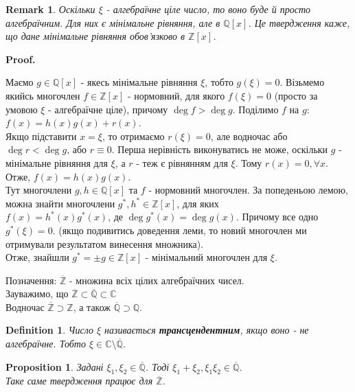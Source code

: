 \documentclass[a4paper, 14pt]{extarticle}
\makeatletter
\theoremstyle{theoremdd}
\theoremstyle{theoremdd}
\newtheorem{definition}[theorem]{Definition}
\theoremstyle{theoremdd}
\theoremstyle{theoremdd}
\theoremstyle{theoremdd}
\newtheorem{proposition}[theorem]{Proposition}
\theoremstyle{theoremdd}
\newtheorem{remark}[theorem]{Remark}
\theoremstyle{theoremdd}
\theoremstyle{theoremdd}
\def\qed{$\blacksquare$}
\renewenvironment{proof}[1][Proof.\\]{\par
\pushQED{\hfill \qed}%
\normalfont \topsep6\p@\@plus6\p@\relax
\trivlist
\item\relax
{\bfseries
#1\@addpunct{.}}\hspace\labelsep\ignorespaces
}{%
\popQED\endtrivlist\@endpefalse
}
\makeatother
\begin{document}
\begin{remark}
Оскільки $\xi$ - алгебраїчне ціле число, то воно буде й просто алгебраїчним. Для них є мінімальне рівняння, але в $\mathbb{Q}[x]$. Це твердження каже, що дане мінімальне рівняння обов'язково в $\mathbb{Z}[x]$.
\end{remark}

\begin{proof}
Маємо $g \in \mathbb{Q}[x]$ - якесь мінімальне рівняння $\xi$, тобто $g(\xi) = 0$. Візьмемо якийсь многочлен $f \in \mathbb{Z}[x]$ - нормовний, для якого $f(\xi) = 0$ (просто за умовою $\xi$ - алгебраїчне ціле), причому $\deg f > \deg g$. Поділимо $f$ на $g$:\\
$f(x) = h(x)g(x) + r(x)$.\\
Якщо підставити $x = \xi$, то отримаємо $r(\xi) = 0$, але водночас або $\deg r < \deg g$, або $r \equiv 0$. Перша нерівність виконуватись не може, оскільки $g$ - мінімальне рівняння для $\xi$, а $r$ - теж є рівнянням для $\xi$. Тому $r(x) = 0, \forall x$.\\
Отже, $f(x) = h(x)g(x)$.\\
Тут многочлени $g,h \in \mathbb{Q}[x]$ та $f$ - нормовний многочлен. За попеденьою лемою, можна знайти многочлени $g^*,h^* \in \mathbb{Z}[x]$, для яких\\
$f(x) = h^*(x)g^*(x)$, де $\deg g^*(x) = \deg g(x)$. Причому все одно $g^*(\xi) = 0$. (якщо подивитись доведення леми, то новий многочлен ми отримували результатом винесення множника).\\
Отже, знайшли $g^* = \pm g \in \mathbb{Z}[x]$ - мінімальний многочлен для $\xi$.
\end{proof}

Позначення: $\overline{\mathbb{Z}}$ - множина всіх цілих алгебраїчних чисел.
\bigskip \\
Зауважимо, що $\overline{\mathbb{Z}} \subset \overline{\mathbb{Q}} \subset \mathbb{C}$\\
Водночас $\overline{\mathbb{Z}} \supset \mathbb{Z}$, а також $\overline{\mathbb{Q}} \supset \mathbb{Q}$.

\begin{definition}
Число $\xi$ називається \textbf{трансцендентним}, якщо воно - не алгебраїчне. Тобто $\xi \in \mathbb{C} \setminus \overline{\mathbb{Q}}$.
\end{definition}

\begin{proposition}
Задані $\xi_1,\xi_2 \in \overline{\mathbb{Q}}$. Тоді $\xi_1+\xi_2, \xi_1 \xi_2 \in \overline{\mathbb{Q}}$.\\
\textit{Таке саме твердження працює для $\overline{\mathbb{Z}}$.}
\end{proposition}
\end{document}
